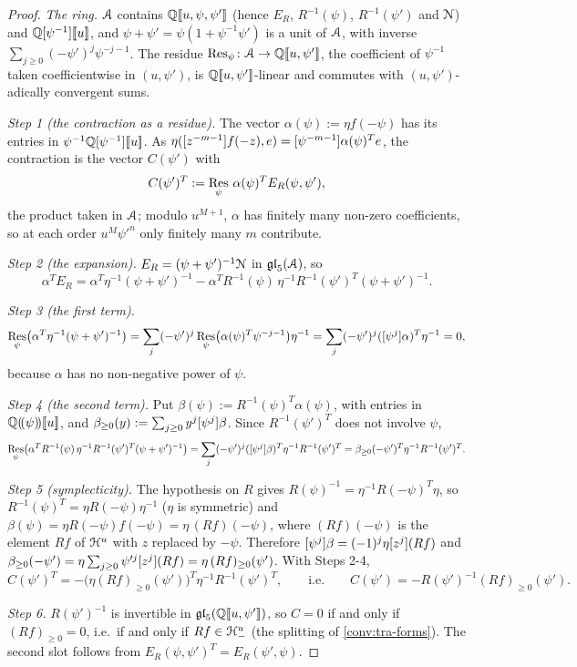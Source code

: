 \begin{proof}
\emph{The ring.} $\mathcal{A}$ contains $\mathbb{Q}[\![ u,\psi,\psi' ]\!]$ (hence $E_R$, $R^{-1}(\psi)$, $R^{-1}(\psi')$ and $\mathcal{N}$) and $\mathbb{Q}[\psi^{-1}][\![ u ]\!]$, and $\psi+\psi' = \psi(1+\psi^{-1}\psi')$ is a unit of $\mathcal{A}$, with inverse $\sum_{j\geq 0}(-\psi')^j\psi^{-j-1}$. The residue $\operatorname*{Res}_\psi\colon\mathcal{A}\to\mathbb{Q}[\![ u,\psi' ]\!]$, the coefficient of $\psi^{-1}$ taken coefficientwise in $(u,\psi')$, is $\mathbb{Q}[\![ u,\psi' ]\!]$-linear and commutes with $(u,\psi')$-adically convergent sums.

\emph{Step 1 (the contraction as a residue).} The vector $\alpha(\psi) := \eta f(-\psi)$ has its entries in $\psi^{-1}\mathbb{Q}[\psi^{-1}][\![ u ]\!]$. As $\eta([z^{-m-1}]f(-z),e) = [\psi^{-m-1}]\alpha(\psi)^Te$, the contraction is the vector $C(\psi')$ with
\[
C(\psi')^T := \operatorname*{Res}_\psi\,\alpha(\psi)^TE_R(\psi,\psi'),
\]
the product taken in $\mathcal{A}$; modulo $u^{M+1}$, $\alpha$ has finitely many non-zero coefficients, so at each order $u^M\psi'^n$ only finitely many $m$ contribute.

\emph{Step 2 (the expansion).} $E_R = (\psi+\psi')^{-1}\mathcal{N}$ in $\mathfrak{gl}_5(\mathcal{A})$, so
\[
\alpha^TE_R = \alpha^T\eta^{-1}(\psi+\psi')^{-1}-\alpha^TR^{-1}(\psi)\,\eta^{-1}R^{-1}(\psi')^T(\psi+\psi')^{-1} .
\]

\emph{Step 3 (the first term).}
\[
\operatorname*{Res}_\psi\bigl(\alpha^T\eta^{-1}(\psi+\psi')^{-1}\bigr) = \sum_j(-\psi')^j\operatorname*{Res}_\psi\bigl(\alpha(\psi)^T\psi^{-j-1}\bigr)\eta^{-1} = \sum_j(-\psi')^j([\psi^j]\alpha)^T\eta^{-1} = 0,
\]
because $\alpha$ has no non-negative power of $\psi$.

\emph{Step 4 (the second term).} Put $\beta(\psi) := R^{-1}(\psi)^T\alpha(\psi)$, with entries in $\mathbb{Q}(\!(\psi)\!)[\![ u ]\!]$, and $\beta_{\geq 0}(y) := \sum_{j\geq 0}y^j[\psi^j]\beta$. Since $R^{-1}(\psi')^T$ does not involve $\psi$,
\[
\operatorname*{Res}_\psi\bigl(\alpha^TR^{-1}(\psi)\,\eta^{-1}R^{-1}(\psi')^T(\psi+\psi')^{-1}\bigr) = \sum_j(-\psi')^j([\psi^j]\beta)^T\eta^{-1}R^{-1}(\psi')^T = \beta_{\geq 0}(-\psi')^T\eta^{-1}R^{-1}(\psi')^T .
\]

\emph{Step 5 (symplecticity).} The hypothesis on $R$ gives $R(\psi)^{-1} = \eta^{-1}R(-\psi)^T\eta$, so $R^{-1}(\psi)^T = \eta R(-\psi)\eta^{-1}$ ($\eta$ is symmetric) and $\beta(\psi) = \eta R(-\psi)f(-\psi) = \eta\,(Rf)(-\psi)$, where $(Rf)(-\psi)$ is the element $Rf$ of $\mathcal{H}^u$ with $z$ replaced by $-\psi$. Therefore $[\psi^j]\beta = (-1)^j\eta[z^j](Rf)$ and $\beta_{\geq 0}(-\psi') = \eta\sum_{j\geq 0}\psi'^j[z^j](Rf) = \eta\,(Rf)_{\geq 0}(\psi')$. With Steps 2-4,
\[
C(\psi')^T = -\bigl(\eta(Rf)_{\geq 0}(\psi')\bigr)^T\eta^{-1}R^{-1}(\psi')^T,\qquad\text{i.e.}\qquad C(\psi') = -R(\psi')^{-1}(Rf)_{\geq 0}(\psi').
\]

\emph{Step 6.} $R(\psi')^{-1}$ is invertible in $\mathfrak{gl}_5(\mathbb{Q}[\![ u,\psi' ]\!])$, so $C = 0$ if and only if $(Rf)_{\geq 0} = 0$, i.e.\ if and only if $Rf\in\mathcal{H}^u_-$ (the splitting of \cref{conv:tra-forms}). The second slot follows from $E_R(\psi,\psi')^T = E_R(\psi',\psi)$.
\end{proof}

